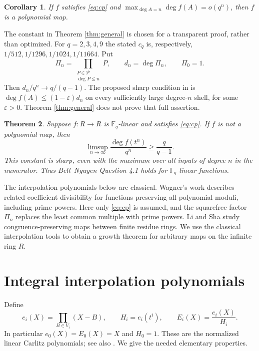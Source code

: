\documentclass[11pt]{article}
\newtheorem{theorem}{Theorem}[section]
\newtheorem{corollary}[theorem]{Corollary}
\newcommand{\F}{\mathbb F}
\newcommand{\PP}{\mathcal P}
\begin{document}
\begin{corollary}\label{cor:littleo}
If $f$ satisfies \eqref{eq:cp} and
$\max_{\deg A=n}\deg f(A)=o(q^n)$, then $f$ is a polynomial map.
\end{corollary}

The constant in Theorem \ref{thm:general} is chosen for a transparent
proof, rather than optimized. For $q=2,3,4,9$ the stated $c_q$ is,
respectively, $1/512,1/1296,1/1024,1/11664$.
Put
\begin{equation}\label{eq:primorial}
 \Pi_n=\prod_{\substack{P\in\PP\\\deg P\le n}}P,
 \qquad d_n=\deg\Pi_n,\qquad \Pi_0=1.
\end{equation}
Then $d_n/q^n\to q/(q-1)$. The proposed sharp condition in
\cite[Question 4.1]{BN} is $\deg f(A)\le(1-\varepsilon)d_n$ on every
sufficiently large degree-$n$ shell, for some $\varepsilon>0$.
Theorem \ref{thm:general} does not prove that full assertion.

\begin{theorem}\label{thm:additive}
Suppose $f:R\to R$ is $\F_q$-linear and satisfies \eqref{eq:cp}.
If $f$ is not a polynomial map, then
\[
 \limsup_{n\to\infty}\frac{\deg f(t^n)}{q^n}\ge\frac q{q-1}.
\]
This constant is sharp, even with the maximum over all inputs of degree
$n$ in the numerator. Thus Bell--Nguyen Question 4.1 holds for
$\F_q$-linear functions.
\end{theorem}

The interpolation polynomials below are classical. Wagner's work
\cite{W74,W76} describes related coefficient divisibility for functions
preserving all polynomial moduli, including prime powers. Here only
\eqref{eq:cp} is assumed, and the squarefree factor $\Pi_n$ replaces the
least common multiple with prime powers. Li and Sha \cite{LS} study
congruence-preserving maps between finite residue rings. We use the
classical interpolation tools to obtain a growth theorem for arbitrary
maps on the infinite ring $R$.

\section{Integral interpolation polynomials}
Define
\begin{equation}\label{eq:carlitz}
 e_i(X)=\prod_{B\in V_i}(X-B),\qquad
 H_i=e_i(t^i),\qquad E_i(X)=\frac{e_i(X)}{H_i}.
\end{equation}
In particular $e_0(X)=E_0(X)=X$ and $H_0=1$.
These are the normalized linear Carlitz polynomials; see also
\cite[Section 2]{W74}. We give the needed elementary properties.
\end{document}
